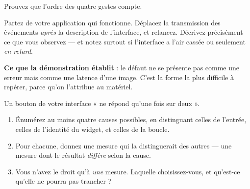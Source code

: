 \begin{nkdemo}
Prouvez que l'ordre des quatre gestes compte.

Partez de votre application qui fonctionne. Déplacez la transmission des
événements \emph{après} la description de l'interface, et relancez. Décrivez
précisément ce que vous observez --- et notez surtout si l'interface a l'air
cassée ou seulement \emph{en retard}.

\textbf{Ce que la démonstration établit} : le défaut ne se présente pas comme une
erreur mais comme une latence d'une image. C'est la forme la plus difficile à
repérer, parce qu'on l'attribue au matériel.
\end{nkdemo}

\begin{nklogique}
Un bouton de votre interface « ne répond qu'une fois sur deux ».

\begin{enumerate}
\item Énumérez au moins quatre causes possibles, en distinguant celles de
      l'entrée, celles de l'identité du widget, et celles de la boucle.
\item Pour chacune, donnez une mesure qui la distinguerait des autres --- une
      mesure dont le résultat \emph{diffère} selon la cause.
\item Vous n'avez le droit qu'à \emph{une} mesure. Laquelle choisissez-vous, et
      qu'est-ce qu'elle ne pourra pas trancher ?
\end{enumerate}
\end{nklogique}
